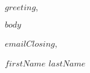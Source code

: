 \documentclass{cobaltCoverLetter}
\date{$date$}
\begin{document}
   \frenchspacing %
  \changefontsize[9pt]{9pt}
  \thispagestyle{cobaltHeader}
   \vspace*{2cm}

  \noindent $greeting$,


  $body$

  \noindent
  $emailClosing$,
  \vspace*{0.75cm}

  \noindent
  \textbf{$firstName$ $lastName$}
\end{document}
